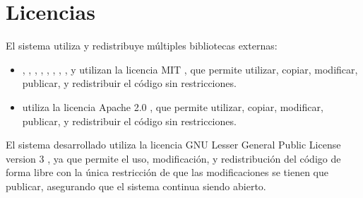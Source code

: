 \section{Licencias}\label{sec:licenses}

El sistema utiliza y redistribuye múltiples bibliotecas externas:

\begin{itemize}
    \item {}, , ,
    , , 
    , , , y
     utilizan la licencia MIT \parencite{MIT}, que permite
    utilizar, copiar, modificar, publicar, y redistribuir el código sin
    restricciones.
    \item {} utiliza la licencia Apache 2.0
    \parencite{apache2}, que permite utilizar, copiar, modificar, publicar, y redistribuir el código sin
    restricciones.
\end{itemize}

El sistema desarrollado utiliza la licencia GNU Lesser General Public License
version 3 \parencite{lgpl}, ya que permite el uso, modificación, y
redistribución del código de forma libre con la única restricción de que las
modificaciones se tienen que publicar, asegurando que el sistema continua siendo
abierto.

